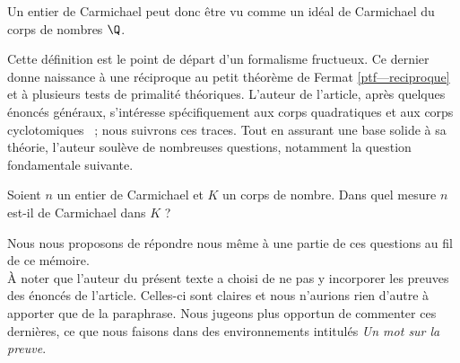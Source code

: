 \begin{remarque}
	Un entier de Carmichael peut donc être vu comme un idéal de Carmichael du corps de nombres $\Q$.
\end{remarque}

Cette définition est le point de départ d'un formalisme fructueux. Ce dernier donne naissance à une réciproque au petit théorème de Fermat \ref{ptf—reciproque} et à plusieurs tests de primalité théoriques. L'auteur de l'article, après quelques énoncés généraux, s'intéresse spécifiquement aux corps quadratiques et aux corps cyclotomiques ~; nous suivrons ces traces. Tout en assurant une base solide à sa théorie, l'auteur soulève de nombreuses questions, notamment la question fondamentale suivante.

\begin{question}\label{question-centrale}Soient $n$ un entier de Carmichael et $K$ un corps de nombre. Dans quel mesure $n$ est-il de Carmichael dans $K$ ?
\end{question}

\noindent Nous nous proposons de répondre nous même à une partie de ces questions au fil de ce mémoire. \\

À noter que l'auteur du présent texte a choisi de ne pas y incorporer les preuves des énoncés de l'article. Celles-ci sont claires et nous n'aurions rien d'autre à apporter que de la paraphrase. Nous jugeons plus opportun de commenter ces dernières, ce que nous faisons dans des environnements intitulés \textit{Un mot sur la preuve}.
